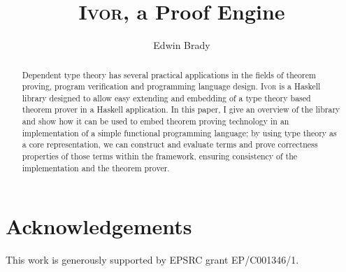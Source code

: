 \documentclass[orivec,dvips,10pt]{llncs}
\newcommand{\Ivor}{\textsc{Ivor}}
\begin{document}
\title{\Ivor{}, a Proof Engine}
\author{Edwin Brady}

 
\maketitle

\begin{abstract}
Dependent type theory has several practical applications in the fields
of theorem proving, program verification and programming language
design. \Ivor{} is a Haskell library designed to allow easy extending
and embedding of a type theory based theorem prover in a Haskell
application. In this paper, I give an overview of the library and show
how it can be used to embed theorem proving technology in an
implementation of a simple functional programming language; by using
type theory as a core representation, we can construct and evaluate
terms and prove correctness properties of those terms within the
 framework, ensuring consistency of the implementation and
the theorem prover. 

\end{abstract}





%







\section*{Acknowledgements}

This work is generously supported by EPSRC grant EP/C001346/1. 


\begin{small}



%

\end{small}
\end{document}
